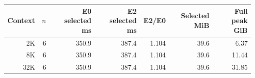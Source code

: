 \begin{tabular}{rrrrrrr}
\toprule
Context & $n$ & E0 selected ms & E2 selected ms & E2/E0 & Selected MiB & Full peak GiB \\
\midrule
2K & 6 & 350.9 & 387.4 & 1.104 & 39.6 & 6.37 \\
8K & 6 & 350.9 & 387.4 & 1.104 & 39.6 & 11.44 \\
32K & 6 & 350.9 & 387.4 & 1.104 & 39.6 & 31.85 \\
\bottomrule
\end{tabular}
